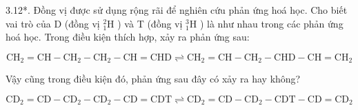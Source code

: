 \documentclass[10pt]{article}
\begin{document}
3.12*. Đồng vị được sử dụng rộng rãi để nghiên cứu phản ứng hoá học. Cho biết vai trò của D (đồng vị ${ }_{1}^{2} \mathrm{H}$ ) và T (đồng vị ${ }_{1}^{3} \mathrm{H}$ ) là như nhau trong các phản ứng hoá học. Trong điều kiện thích hợp, xảy ra phản ứng sau:


\begin{equation*}
\mathrm{CH}_{2}=\mathrm{CH}-\mathrm{CH}_{2}-\mathrm{CH}_{2}-\mathrm{CH}=\mathrm{CHD} \rightleftharpoons \mathrm{CH}_{2}=\mathrm{CH}-\mathrm{CH}_{2}-\mathrm{CHD}-\mathrm{CH}=\mathrm{CH}_{2} \tag{1}
\end{equation*}


Vậy cũng trong điều kiện đó, phản ứng sau đây có xảy ra hay không?


\begin{equation*}
\mathrm{CD}_{2}=\mathrm{CD}-\mathrm{CD}_{2}-\mathrm{CD}_{2}-\mathrm{CD}=\mathrm{CDT} \rightleftharpoons \mathrm{CD}_{2}=\mathrm{CD}-\mathrm{CD}_{2}-\mathrm{CDT}-\mathrm{CD}=\mathrm{CD}_{2} \tag{2}
\end{equation*}
\end{document}
